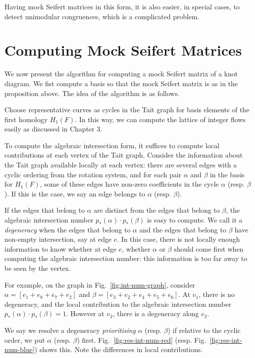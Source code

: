 \documentclass[12pt]{report}
\theoremstyle{upright}
\begin{document}
Having mock Seifert matrices in this form, it is also easier, in special cases, to detect unimodular congruences, which is a complicated problem.

\section{Computing Mock Seifert Matrices}

We now present the algorithm for computing a mock Seifert matrix of a knot diagram. We fist compute a basis so that the mock Seifert matrix is as in the proposition above. The idea of the algorithm is as follows.

Choose representative curves as cycles in the Tait graph  for basis elements of the first homology $H_{1}(F)$. In this way, we can compute the lattice of integer flows easily as discussed in Chapter 3.

To compute the algebraic intersection form, it suffices to compute local contributions at each vertex of the Tait graph. Consider the information about the Tait graph available locally at each vertex: there are several edges with a cyclic ordering from the rotation system, and for each pair $\alpha$ and $\beta$ in the basis for $H_{1}(F)$, some of these edges have non-zero coefficients in the cycle $\alpha$ (resp. $\beta$). If this is the case, we say an edge belongs to $\alpha$ (resp. $\beta$).

If the edges that belong to $\alpha$ are distinct from the edges that belong to $\beta$, the algebraic intersection number $p_{*}(\alpha) \cdot p_{*}(\beta)$ is easy to compute. We call it a \textit{degeneracy} when the edges that belong to $\alpha$ and the edges that belong to $\beta$ have non-empty intersection, say at edge $e$. In this case, there is not locally enough information to know whether at edge $e$, whether $\alpha$ or $\beta$ should come first when computing the algebraic intersection number: this information is too far away to be seen by the vertex.

For example, on the graph in Fig.~\ref{fig:int-num-graph}, consider $\alpha = [e_{1} + e_{8} + e_{7} + e_{2}]$ and $\beta = [e_{3} + e_{2} + e_{4} + e_{5} + e_{6}]$. At $v_{1}$, there is no degeneracy, and the local contribution to the algebraic intersection number $p_{*}(\alpha) \cdot p_{*}(\beta) = 1$. However at $v_{2}$, there is a degeneracy along $e_{2}$.

We say we resolve a degeneracy \textit{prioritising} $\alpha$ (resp. $\beta$) if relative to the cyclic order, we put $\alpha$ (resp. $\beta$) first. Fig.~\ref{fig:res-int-num-red} (resp. Fig.~\ref{fig:res-int-num-blue}) shows this. Note the differences in local contributions.
\end{document}
